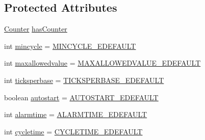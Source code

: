 \subsection*{Protected Attributes}
\begin{DoxyCompactItemize}
\item 
\hyperlink{interfaceshootingmachineemfmodel_1_1_counter}{Counter} \hyperlink{classshootingmachineemfmodel_1_1impl_1_1_alarm_impl_ac48b4b9a1a543ec8b9ee89cc128ac673}{has\-Counter}
\item 
int \hyperlink{classshootingmachineemfmodel_1_1impl_1_1_alarm_impl_ae26a6934576aacef8b9aae1e6c6a3010}{mincycle} = \hyperlink{classshootingmachineemfmodel_1_1impl_1_1_alarm_impl_a292caf682730a300a1517d0a42910743}{M\-I\-N\-C\-Y\-C\-L\-E\-\_\-\-E\-D\-E\-F\-A\-U\-L\-T}
\item 
int \hyperlink{classshootingmachineemfmodel_1_1impl_1_1_alarm_impl_a63897cf99fd1eba61bc5fd9aa6d168ca}{maxallowedvalue} = \hyperlink{classshootingmachineemfmodel_1_1impl_1_1_alarm_impl_af80742cf00da4bbdb1a55441e3e18835}{M\-A\-X\-A\-L\-L\-O\-W\-E\-D\-V\-A\-L\-U\-E\-\_\-\-E\-D\-E\-F\-A\-U\-L\-T}
\item 
int \hyperlink{classshootingmachineemfmodel_1_1impl_1_1_alarm_impl_ab4ed313bc24457b3837532824d660c94}{ticksperbase} = \hyperlink{classshootingmachineemfmodel_1_1impl_1_1_alarm_impl_a3c3b372b88aaa3f67b535965a8c3262a}{T\-I\-C\-K\-S\-P\-E\-R\-B\-A\-S\-E\-\_\-\-E\-D\-E\-F\-A\-U\-L\-T}
\item 
boolean \hyperlink{classshootingmachineemfmodel_1_1impl_1_1_alarm_impl_afc1bb0e74f4c4da81e00d2263997fb2f}{autostart} = \hyperlink{classshootingmachineemfmodel_1_1impl_1_1_alarm_impl_ae3645bdaa1939ee466b393bec08d2ad3}{A\-U\-T\-O\-S\-T\-A\-R\-T\-\_\-\-E\-D\-E\-F\-A\-U\-L\-T}
\item 
int \hyperlink{classshootingmachineemfmodel_1_1impl_1_1_alarm_impl_aabc3718d53d5050412741b48266549fb}{alarmtime} = \hyperlink{classshootingmachineemfmodel_1_1impl_1_1_alarm_impl_ab1311546de8d5b8a4a39f776185907f8}{A\-L\-A\-R\-M\-T\-I\-M\-E\-\_\-\-E\-D\-E\-F\-A\-U\-L\-T}
\item 
int \hyperlink{classshootingmachineemfmodel_1_1impl_1_1_alarm_impl_a46d6e8977ebf62cb1750a0ae81d7cf1e}{cycletime} = \hyperlink{classshootingmachineemfmodel_1_1impl_1_1_alarm_impl_a8014dd85bb93f14eda34c8ba7fd6e572}{C\-Y\-C\-L\-E\-T\-I\-M\-E\-\_\-\-E\-D\-E\-F\-A\-U\-L\-T}
\end{DoxyCompactItemize}

